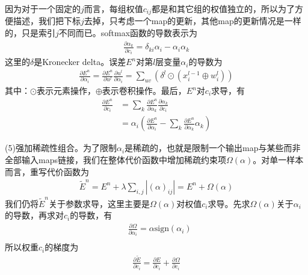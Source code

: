             因为对于一个固定的$j$而言，每组权值$c_{ij}$都是和其它组的权值独立的，所以为了方便描述，我们把下标$j$去掉，只考虑一个map的更新，其他map的更新情况是一样的，只是索引$j$不同而已。softmax函数的导数表示为
            \begin{align*}
            \frac{\partial \alpha_k}{\partial c_i} = \delta_{ki}\alpha_i - \alpha_i\alpha_k
            \end{align*}
            这里的$\delta$是Kronecker delta。误差$E^n$对第$l$层变量$\alpha_i$的导数为
            \begin{align*}
            \frac{\partial E^n }{\partial \alpha_i} = \frac{\partial E^n}{\partial u^l} \frac{\partial u^l}{\partial \alpha_i} = \sum_{uv} \left( \delta ^l\odot(x_i^{l-1}\oplus w_i^l)  \right)
            \end{align*}
            其中：$\odot$表示元素操作，$\oplus$表示卷积操作。最后，$E^n$对$c_i$求导，有
            \begin{align*}
            \frac{\partial E^n}{\partial c_i} &= \sum_k \frac{\partial E^n}{\partial \alpha_k}\frac{\partial \alpha_k}{\partial c_i}\\
            &=\alpha_i \left( \frac{\partial E^n}{\partial \alpha_i} - \sum_{k}\frac{\partial E^n}{\partial \alpha_k}\alpha_k \right)
            \end{align*}
            \par
            (5)强加稀疏性组合。为了限制$\alpha_i$是稀疏的，也就是限制一个输出map与某些而非全部输入maps链接，我们在整体代价函数中增加稀疏约束项$\Omega(\alpha)$。对单一样本而言，重写代价函数为
            \begin{align*}
            \tilde{E}^n = E^n + \lambda \sum_{i,j} |(\alpha)_{ij}| = E^n + \Omega(\alpha)
            \end{align*}
            我们仍将$\tilde{E}^n$关于参数求导，这里主要是$\Omega(\alpha)$对权值$c_i$求导。先求$\Omega(\alpha)$关于$\alpha_i$的导数，再求对$c_i$的导数，有
            \begin{align*}
            & \frac{\partial \Omega}{\partial \alpha_i} = \alpha \mathrm{sign}(\alpha_i)\\
            \end{align*}
            所以权重$c_i$的梯度为
            \begin{align*}
            \frac{\partial \tilde{E}}{\partial c_i} = \frac{\partial E}{\partial c_i} + \frac{\partial \Omega }{\partial c_i}
            \end{align*}
